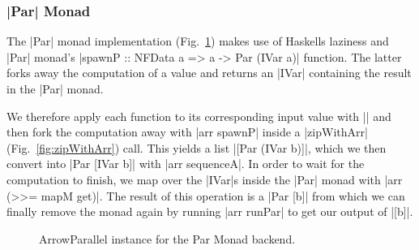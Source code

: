 \subsubsection{|Par| Monad}
The |Par| monad implementation (Fig.~\ref{fig:ArrowParallelParMonad}) makes use of Haskells laziness and |Par| monad's |spawnP :: NFData a => a -> Par (IVar a)| function. The latter forks away the computation of a value and returns an |IVar| containing the result in the |Par| monad.


We therefore apply each function to its corresponding input value with || and then fork the computation away with |arr spawnP| inside a |zipWithArr| (Fig.~\ref{fig:zipWithArr}) call. This yields a list |[Par (IVar b)]|, which we then convert into |Par [IVar b]| with |arr sequenceA|. In order to wait for the computation to finish, we map over the |IVar|s inside the |Par| monad with |arr (>>= mapM get)|. The result of this operation is a |Par [b]| from which we can finally remove the monad again by running |arr runPar| to get our output of |[b]|.
\begin{figure}[h]
\caption{ArrowParallel instance for the Par Monad backend.}
\label{fig:ArrowParallelParMonad}
\end{figure}

